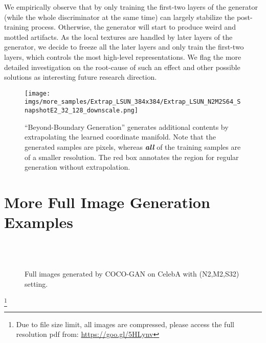 \documentclass{article}
\newcommand{\modelName}{COCO-GAN }
\newcommand\blfootnote[1]{\begingroup
  \renewcommand\thefootnote{}\footnote{#1}\addtocounter{footnote}{-1}\endgroup
}
\begin{document}
\begin{appendices}
    We empirically observe that by only training the first-two layers of the generator (while the whole discriminator at the same time) can largely stabilize the post-training process. Otherwise, the generator will start to produce weird and mottled artifacts. As the local textures are handled by later layers of the generator, we decide to freeze all the later layers and only train the first-two layers, which controls the most high-level representations. We flag the more detailed investigation on the root-cause of such an effect and other possible solutions as interesting future research direction.
    
    \begin{figure}[H]
        \vspace{2em}
        \centering
        \texttt{[image: imgs/more\_samples/Extrap\_LSUN\_384x384/Extrap\_LSUN\_N2M2S64\_SnapshotE2\_32\_128\_downscale.png]}
        \caption{``Beyond-Boundary Generation'' generates additional contents by extrapolating the learned coordinate manifold. Note that the generated samples are  pixels, whereas \textbf{\textit{all}} of the training samples are of a smaller  resolution. The {\color{red} red} box annotates the  region for regular generation without extrapolation.}
        \label{fig:more-beyond-boundary-generation}
    \end{figure}
    
\section{More Full Image Generation Examples}
    \label{appendix:more-full-images}
    \begin{figure}[H]
        \centering
         \\ [0.5em]
         \\ [0.5em]
        \caption{Full images generated by \modelName on CelebA  with (N2,M2,S32) setting.}
        \label{fig:more-generation}
        \vspace{-1em}
    \end{figure}
    \blfootnote{Due to file size limit, all images are compressed, please access the full resolution pdf from: {\color{blue}\urlstyle{same}\url{https://goo.gl/5HLynv}}}
    

\end{appendices}
\end{document}
